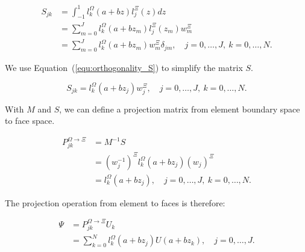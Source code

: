 \begin{equation} \label{equ:matrix_S}
    \begin{aligned}
        S_{jk} & = \int_{-1}^{1} l_k ^ \Omega \left( a + b z \right) l_j ^ \Xi \left( z \right) dz                                             \\
               & = \sum_{m = 0}^{J} l_k ^ \Omega \left( a + b z_m \right) l_j ^ \Xi \left( z_m \right) w_m ^ \Xi                               \\
               & = \sum_{m = 0}^{J} l_k ^ \Omega \left( a + b z_m \right) w_m ^{\Xi} \delta_{jm}, \quad j = 0, \ldots, J, \: k = 0, \ldots, N.
    \end{aligned}
\end{equation}

\noindent
We use Equation~(\ref{equ:orthogonality_S}) to simplify the matrix \(S\).

\begin{equation}
    S_{jk} = l_k^{\Omega } \left( a + bz_j \right) w_j^{\Xi}, \quad j = 0, \ldots, J, \: k = 0, \ldots, N.
\end{equation}

With \(M\) and \(S\), we can define a projection matrix from element boundary space to face space.

\begin{equation}
    \begin{aligned}
        P_{jk} ^ {\Omega \rightarrow \Xi} & = M^{-1}S                                                                                             \\
                                          & = {\left( w_j ^{-1} \right)}^{\Xi }  l_k ^ \Omega \left( a + b z_j \right) {\left( w_j \right)}^{\Xi} \\
                                          & = l_k ^ \Omega \left(a + b z_j \right), \quad j = 0, \ldots, J, \: k = 0, \ldots, N.
    \end{aligned}
\end{equation}

The projection operation from element to faces is therefore:

\begin{align}  \label{projection_element_to_face}
    \Psi & = P_{jk}^{\Omega \rightarrow \Xi} U_k                                          \\
         & = \sum_{k = 0}^{N}l_k ^ \Omega(a+ b z_j) U(a + b z_k), \quad j = 0, \ldots, J.
\end{align}

